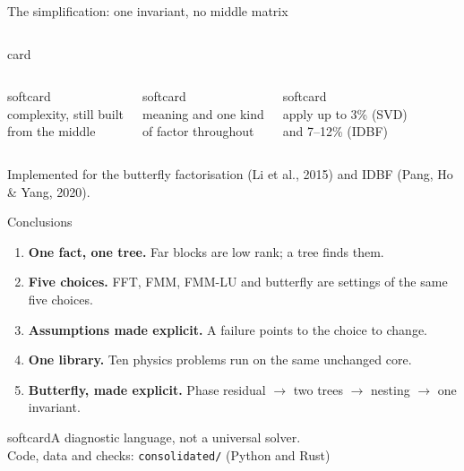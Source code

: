 \documentclass[aspectratio=169,10pt,t]{beamer}
\newcommand{\punch}[1]{\begin{beamercolorbox}[rounded=true,sep=1ex]{softcard}\centering\small #1\end{beamercolorbox}}
\begin{document}
\begin{frame}{The simplification: one invariant, no middle matrix}
\begin{columns}[T,onlytextwidth]
\begin{beamercolorbox}[rounded=true,sep=1ex]{card}
\end{beamercolorbox}
\end{columns}
\vspace{2mm}
\begin{columns}[T,onlytextwidth]
\begin{beamercolorbox}[rounded=true,sep=.9ex,center]{softcard}
\\[1mm]\footnotesize complexity, still built\\ from the middle
\end{beamercolorbox}
\begin{beamercolorbox}[rounded=true,sep=.9ex,center]{softcard}
\\[1mm]\footnotesize meaning and one kind\\ of factor throughout
\end{beamercolorbox}
\begin{beamercolorbox}[rounded=true,sep=.9ex,center]{softcard}
\\[1mm]\footnotesize apply up to 3\% (SVD)\\ and 7--12\% (IDBF)
\end{beamercolorbox}
\end{columns}
\vspace{2mm}
\centering\scriptsize\color{muted}Implemented for the butterfly factorisation (Li et al., 2015) and IDBF (Pang, Ho \& Yang, 2020).
\end{frame}

\begin{frame}{Conclusions}\label{s:concl}
\vspace{3mm}
\begin{enumerate}
\setlength{\itemsep}{3mm}
\item \textbf{One fact, one tree.} Far blocks are low rank; a tree finds them.
\item \textbf{Five choices.} FFT, FMM, FMM-LU and butterfly are settings of the same five choices.
\item \textbf{Assumptions made explicit.} A failure points to the choice to change.
\item \textbf{One library.} Ten physics problems run on the same unchanged core.
\item \textbf{Butterfly, made explicit.} Phase residual $\to$ two trees $\to$ nesting $\to$ one invariant.
\end{enumerate}
\vspace{4mm}
\punch{A diagnostic language, not a universal solver.\\[.5mm]
\scriptsize Code, data and checks: \texttt{consolidated/} (Python and Rust)}
\end{frame}
\end{document}

